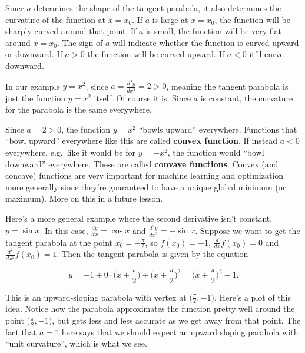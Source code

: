 \documentclass[
  letterpaper,
  DIV=11,
  numbers=noendperiod]{scrreprt}
\begin{document}
Since \(a\) determines the shape of the tangent parabola, it also
determines the curvature of the function at \(x=x_0\). If \(a\) is large
at \(x=x_0\), the function will be sharply curved around that point. If
\(a\) is small, the function will be very flat around \(x=x_0\). The
sign of \(a\) will indicate whether the function is curved upward or
downward. If \(a>0\) the function will be curved upward. If \(a < 0\)
it'll curve downward.

In our example \(y=x^2\), since \(a=\frac{d^2 y}{dx^2} = 2 > 0\),
meaning the tangent parabola is just the function \(y=x^2\) itself. Of
course it is. Since \(a\) is constant, the curvature for the parabola is
the same everywhere.

Since \(a=2>0\), the function \(y=x^2\) ``bowls upward'' everywhere.
Functions that ``bowl upward'' everywhere like this are called
\textbf{convex function}. If instead \(a < 0\) everywhere, e.g.~like it
would be for \(y=-x^2\), the function would ``bowl downward''
everywhere. These are called \textbf{convave functions}. Convex (and
concave) functions are very important for machine learning and
optimization more generally since they're guaranteed to have a unique
global minimum (or maximum). More on this in a future lesson.

Here's a more general example where the second derivative isn't
constant, \(y = \sin x\). In this case, \(\frac{dy}{dx} = \cos x\) and
\(\frac{d^2y}{dx^2} = -\sin x\). Suppose we want to get the tangent
parabola at the point \(x_0=-\frac{\pi}{2}\), so \(f(x_0)=-1\),
\(\frac{d}{dx}f(x_0)=0\) and \(\frac{d^2}{dx^2}f(x_0)=1\). Then the
tangent parabola is given by the equation

\[y = -1 + 0 \cdot \bigg(x + \frac{\pi}{2}\bigg) + \bigg(x + \frac{\pi}{2}\bigg)^2 = \bigg(x + \frac{\pi}{2}\bigg)^2 - 1.\]

This is an upward-sloping parabola with vertex at
\(\big(\frac{\pi}{2}, -1\big)\). Here's a plot of this idea. Notice how
the parabola approximates the function pretty well around the point
\(\big(\frac{\pi}{2}, -1\big)\), but gets less and less accurate as we
get away from that point. The fact that \(a=1\) here says that we should
expect an upward sloping parabola with ``unit curvature'', which is what
we see.
\end{document}
